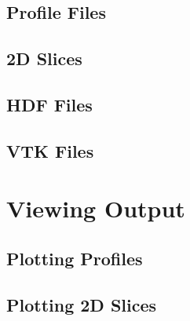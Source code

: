 \documentclass[12pt,a4paper]{book}
\begin{document}
\subsection{Profile Files}
\subsection{2D Slices}
\subsection{HDF Files}
\subsection{VTK Files}
\section{Viewing Output}
\subsection{Plotting Profiles}
\subsection{Plotting 2D Slices}
\end{document}
